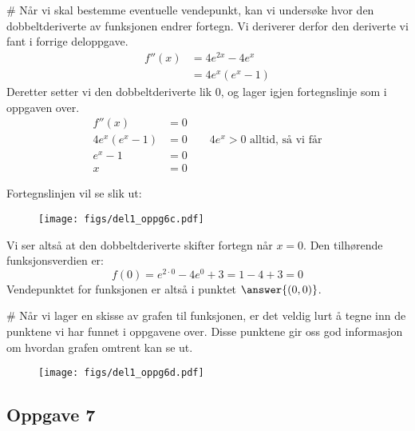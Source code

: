 \begin{easylist}[enumerate]
	
	# Når vi skal bestemme eventuelle vendepunkt, kan vi undersøke hvor den dobbeltderiverte av funksjonen endrer fortegn. 
	Vi deriverer derfor den deriverte vi fant i forrige deloppgave. 
	\begin{align*}
		f''(x) & = 4e^{2x} - 4e^x \\
		& = 4e^x(e^x -1)
	\end{align*}
	Deretter setter vi den dobbeltderiverte lik $0$, og lager igjen fortegnslinje som i oppgaven over.
	\begin{align*}
		f''(x) & = 0 \\
		4e^x(e^x-1) & = 0 \qquad \text{$4e^x > 0$ alltid, så vi får}\\ 
		e^x -1 & = 0 \\
		x & = 0
	\end{align*}
	
	Fortegnslinjen vil se slik ut:
	\begin{figure}[ht!]
		\centering
		\texttt{[image: figs/del1\_oppg6c.pdf]}
		\label{fig:del1_oppg6c}
	\end{figure}
	Vi ser altså at den dobbeltderiverte skifter fortegn når $x=0$. 
	Den tilhørende funksjonsverdien er: 
	\begin{equation*}
	f(0) = e^{2 \cdot 0} - 4e^0 + 3 = 1 -4 +3 = 0
	\end{equation*}	
	Vendepunktet for funksjonen er altså i punktet $\answer{(0,0)}$.
	
	# Når vi lager en skisse av grafen til funksjonen, er det veldig lurt å tegne inn de punktene vi har funnet i oppgavene over. 
	Disse punktene gir oss god informasjon om hvordan grafen omtrent kan se ut. 
	\begin{figure}[ht!]
		\centering
		\texttt{[image: figs/del1\_oppg6d.pdf]}
		\label{fig:del1_oppg6d}
	\end{figure}
\end{easylist}


\subsection*{Oppgave 7}

